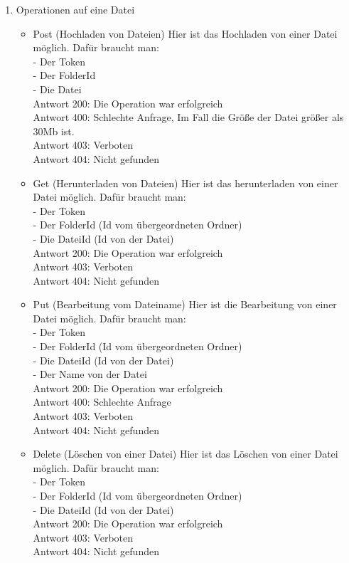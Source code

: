 \begin{enumerate}
\item Operationen auf eine Datei
	\begin{itemize}
	\item Post (Hochladen von Dateien)
Hier ist das Hochladen von einer Datei m\"oglich. Daf\"ur braucht man: \\
	- Der Token \\
	- Der FolderId \\
	- Die Datei \\
Antwort 200: Die Operation war erfolgreich \\ 
Antwort 400: Schlechte Anfrage, Im Fall die Gr\"o{\ss}e der Datei gr\"o{\ss}er als 30Mb ist. \\
Antwort 403: Verboten \\
Antwort 404: Nicht gefunden
	\item Get (Herunterladen von Dateien)
Hier ist das herunterladen von einer Datei m\"oglich. Daf\"ur braucht man: \\
	- Der Token \\
	- Der FolderId (Id vom \"ubergeordneten Ordner) \\
	- Die DateiId (Id von der Datei) \\
Antwort 200: Die Operation war erfolgreich \\ 
Antwort 403: Verboten \\
Antwort 404: Nicht gefunden
	\item Put (Bearbeitung vom Dateiname)
Hier ist die Bearbeitung von einer Datei m\"oglich. Daf\"ur braucht man: \\
	- Der Token \\
	- Der FolderId (Id vom \"ubergeordneten Ordner) \\
	- Die DateiId (Id von der Datei) \\
	- Der Name von der Datei \\
Antwort 200: Die Operation war erfolgreich \\ 
Antwort 400: Schlechte Anfrage \\
Antwort 403: Verboten \\
Antwort 404: Nicht gefunden
	\item Delete (Löschen von einer Datei)
Hier ist das L\"oschen von einer Datei m\"oglich. Daf\"ur braucht man: \\
	- Der Token \\
	- Der FolderId (Id vom \"ubergeordneten Ordner) \\
	- Die DateiId (Id von der Datei) \\
Antwort 200: Die Operation war erfolgreich \\ 
Antwort 403: Verboten \\
Antwort 404: Nicht gefunden
	\end{itemize}


\end{enumerate}
